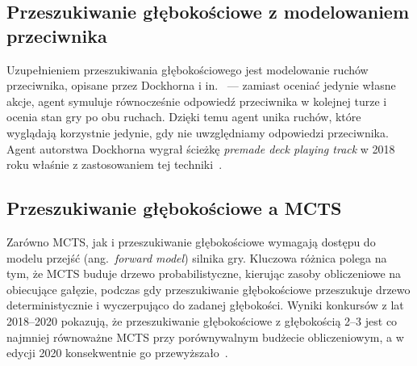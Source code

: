 \subsection{Przeszukiwanie głębokościowe z modelowaniem przeciwnika}

Uzupełnieniem przeszukiwania głębokościowego jest modelowanie ruchów przeciwnika, opisane przez Dockhorna i in.~\cite{dockhorn2018} --- zamiast oceniać jedynie własne akcje, agent symuluje równocześnie odpowiedź przeciwnika w kolejnej turze i ocenia stan gry po obu ruchach. Dzięki temu agent unika ruchów, które wyglądają korzystnie jedynie, gdy nie uwzględniamy odpowiedzi przeciwnika. Agent autorstwa Dockhorna wygrał ścieżkę \textit{premade deck playing track} w 2018 roku właśnie z zastosowaniem tej techniki~\cite{dockhorn2018, hearthstone_competition}.

\subsection{Przeszukiwanie głębokościowe a MCTS}

Zarówno MCTS, jak i przeszukiwanie głębokościowe wymagają dostępu do modelu przejść (ang.~\textit{forward model}) silnika gry. Kluczowa różnica polega na tym, że MCTS buduje drzewo probabilistyczne, kierując zasoby obliczeniowe na obiecujące gałęzie, podczas gdy przeszukiwanie głębokościowe przeszukuje drzewo deterministycznie i wyczerpująco do zadanej głębokości. Wyniki konkursów z lat 2018--2020 pokazują, że przeszukiwanie głębokościowe z głębokością 2--3 jest co najmniej równoważne MCTS przy porównywalnym budżecie obliczeniowym, a w edycji 2020 konsekwentnie go przewyższało~\cite{hearthstone_competition, dockhorn2019}.
